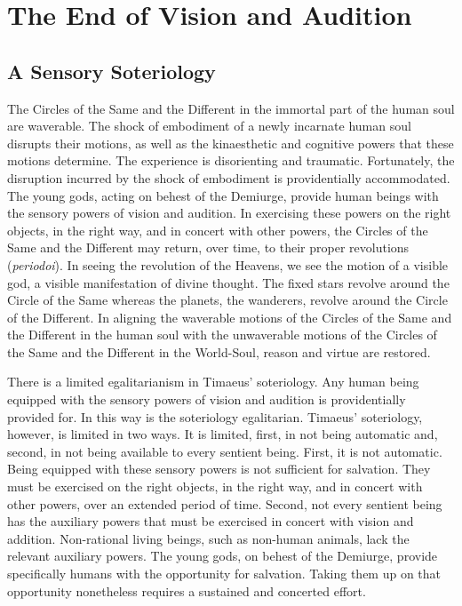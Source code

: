 \chapter{The End of Vision and Audition} %
\label{cha:the_end_of_vision_and_audition}

\section{A Sensory Soteriology} %
\label{sec:a_sensory_soteriology}
The Circles of the Same and the Different in the immortal part of the human soul are waverable. The shock of embodiment of a newly incarnate human soul disrupts their motions, as well as the kinaesthetic and cognitive powers that these motions determine. The experience is disorienting and traumatic. Fortunately, the disruption incurred by the shock of embodiment is providentially accommodated. The young gods, acting on behest of the Demiurge, provide human beings with the sensory powers of vision and audition. In exercising these powers on the right objects, in the right way, and in concert with other powers, the Circles of the Same and the Different may return, over time, to their proper revolutions (\emph{periodoi}). In seeing the revolution of the Heavens, we see the motion of a visible god, a visible manifestation of divine thought. The fixed stars revolve around the Circle of the Same whereas the planets, the wanderers, revolve around the Circle of the Different. In aligning the waverable motions of the Circles of the Same and the Different in the human soul with the unwaverable motions of the Circles of the Same and the Different in the World-Soul, reason and virtue are restored. 

There is a limited egalitarianism in Timaeus' soteriology. Any human being equip\-ped with the sensory powers of vision and audition is providentially provided for. In this way is the soteriology egalitarian. Timaeus' soteriology, however, is limited in two ways. It is limited, first, in not being automatic and, second, in not being available to every sentient being. First, it is not automatic. Being equipped with these sensory powers is not sufficient for salvation. They must be exercised on the right objects, in the right way, and in concert with other powers, over an extended period of time. Second, not every sentient being has the auxiliary powers that must be exercised in concert with vision and addition. Non-rational living beings, such as non-human animals, lack the relevant auxiliary powers. The young gods, on behest of the Demiurge, provide specifically humans with the opportunity for salvation. Taking them up on that opportunity nonetheless requires a sustained and concerted effort.

